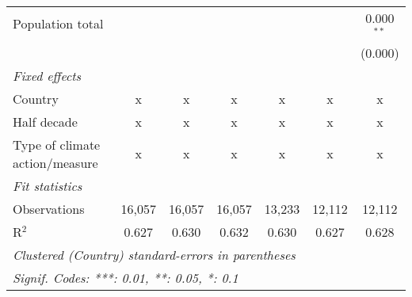 \begin{tabular}{lcccccc}
   Population total                                              &         &               &               &                &                & 0.000$^{**}$\\   
                                                                 &         &               &               &                &                & (0.000)\\   
   \emph{Fixed effects}\\
   Country                                                       & x       & x             & x             & x              & x              & x\\  
   Half decade                                                   & x       & x             & x             & x              & x              & x\\  
   Type of climate action/measure                                & x       & x             & x             & x              & x              & x\\  
   \midrule \emph{Fit statistics}\\
   Observations                                                  & 16,057  & 16,057        & 16,057        & 13,233         & 12,112         & 12,112\\  
   R$^2$                                                         & 0.627   & 0.630         & 0.632         & 0.630          & 0.627          & 0.628\\  
   \midrule
   \multicolumn{7}{l}{\emph{Clustered (Country) standard-errors in parentheses}}\\
   \multicolumn{7}{l}{\emph{Signif. Codes: ***: 0.01, **: 0.05, *: 0.1}}\\
\end{tabular}
\par\endgroup


